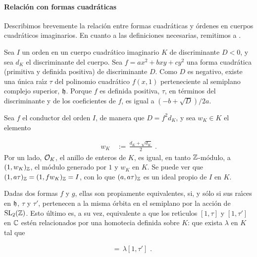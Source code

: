 
\paragraph{Relaci\'{o}n con formas cuadr\'{a}ticas}
Describimos brevemente la relaci\'{o}n entre formas
cuadr\'{a}ticas y \'{o}rdenes en cuerpos cuadr\'{a}ticos imaginarios.
En cuanto a las definiciones necesarias, remitimos a \cite{cox}.

Sea $I$ un orden en un cuerpo cuadr\'{a}tico imaginario $K$ de
discriminante $D<0$, y sea $d_{K}$ el discriminante del cuerpo.
Sea $f=ax^{2}+bxy+cy^{2}$ una forma cuadr\'{a}tica (primitiva y
definida positiva) de discriminante $D$. Como $D$ es negativo, existe
una \'{u}nica ra\'{\i}z $\tau$ del polinomio cuadr\'{a}tico $f(x,1)$
perteneciente al semiplano complejo superior, $\frak{h}$. Porque $f$
es definida positiva, $\tau$, en t\'{e}rminos del discriminante y de
los coeficientes de $f$, es igual a $(-b+\sqrt{D})/2a$.

Sea $f$ el conductor del orden $I$, de manera que $D=f^{2}d_{K}$, y sea
$w_{K}\in K$ el elemento

\begin{align*}
w_{K} & \,:=\,\frac{d_{K}+\sqrt{d_{K}}}{2}
\text{ .}
\end{align*}
Por un lado, $\cal{O}_{K}$, el anillo de enteros de $K$, es igual, en tanto
$\bb{Z}$-m\'{o}dulo, a $(1,w_{K})_{\bb{Z}}$, el m\'{o}dulo generado por $1$ y
$w_{K}$ en $K$. Se puede ver que $(1,a\tau)_{\bb{Z}}=(1,fw_{K})_{\bb{Z}}=I$,
con lo que $(a,a\tau)_{\bb{Z}}$ es un ideal propio de $I$ en $K$.

Dadas dos formas $f$ y $g$, ellas son propiamente equivalentes,
si, y s\'{o}lo si sus ra\'{\i}ces en $\frak{h}$, $\tau$ y $\tau'$,
pertenecen a la misma \'{o}rbita en el semiplano por la acci\'{o}n de
$\SL{2}(\bb{Z})$. Esto \'{u}ltimo es, a su vez, equivalente a que los
ret\'{\i}culos $[1,\tau]$ y $[1,\tau']$ en $\bb{C}$ est\'{e}n
relacionados por una homotecia definida sobre $K$: que exista $\lambda$
en $K$ tal que

\begin{align*}
[1,\tau] & \,=\,\lambda [1,\tau']
\text{ .}
\end{align*}

